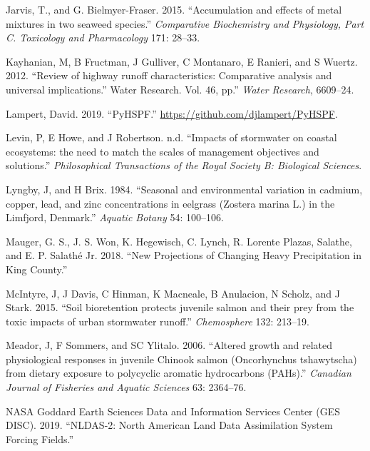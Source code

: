 \documentclass[
]{report}
\begin{document}
\leavevmode\hypertarget{ref-Jarvis2015}{}%
Jarvis, T., and G. Bielmyer-Fraser. 2015. ``Accumulation and effects of metal mixtures in two seaweed species.'' \emph{Comparative Biochemistry and Physiology, Part C. Toxicology and Pharmacology} 171: 28--33.

\leavevmode\hypertarget{ref-Kayhanian2012}{}%
Kayhanian, M, B Fructman, J Gulliver, C Montanaro, E Ranieri, and S Wuertz. 2012. ``Review of highway runoff characteristics: Comparative analysis and universal implications.'' Water Research. Vol. 46, pp.'' \emph{Water Research}, 6609--24.

\leavevmode\hypertarget{ref-Lampert2019}{}%
Lampert, David. 2019. ``PyHSPF.'' \url{https://github.com/djlampert/PyHSPF}.

\leavevmode\hypertarget{ref-Levin}{}%
Levin, P, E Howe, and J Robertson. n.d. ``Impacts of stormwater on coastal ecosystems: the need to match the scales of management objectives and solutions.'' \emph{Philosophical Transactions of the Royal Society B: Biological Sciences}.

\leavevmode\hypertarget{ref-Lyngby1984}{}%
Lyngby, J, and H Brix. 1984. ``Seasonal and environmental variation in cadmium, copper, lead, and zinc concentrations in eelgrass (Zostera marina L.) in the Limfjord, Denmark.'' \emph{Aquatic Botany} 54: 100--106.

\leavevmode\hypertarget{ref-Jr2018}{}%
Mauger, G. S., J. S. Won, K. Hegewisch, C. Lynch, R. Lorente Plazas, Salathe, and E. P. Salathé Jr. 2018. ``New Projections of Changing Heavy Precipitation in King County.''

\leavevmode\hypertarget{ref-McIntyre2015}{}%
McIntyre, J, J Davis, C Hinman, K Macneale, B Anulacion, N Scholz, and J Stark. 2015. ``Soil bioretention protects juvenile salmon and their prey from the toxic impacts of urban stormwater runoff.'' \emph{Chemosphere} 132: 213--19.

\leavevmode\hypertarget{ref-Meador2006}{}%
Meador, J, F Sommers, and SC Ylitalo. 2006. ``Altered growth and related physiological responses in juvenile Chinook salmon (Oncorhynchus tshawytscha) from dietary exposure to polycyclic aromatic hydrocarbons (PAHs).'' \emph{Canadian Journal of Fisheries and Aquatic Sciences} 63: 2364--76.

\leavevmode\hypertarget{ref-NASAGoddardEarthSciencesDataandInformationServicesCenterGESDISC2019}{}%
NASA Goddard Earth Sciences Data and Information Services Center (GES DISC). 2019. ``NLDAS-2: North American Land Data Assimilation System Forcing Fields.''
\end{document}
